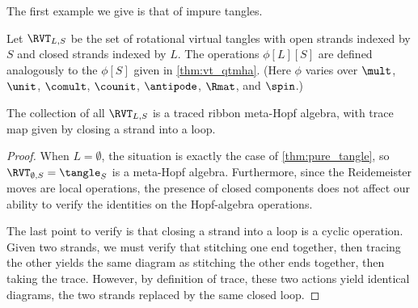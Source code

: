 The first example we give is that of impure tangles.

\begin{definition}
        Let $\RVT_{L, S}$ be the set of rotational virtual tangles with open
        strands indexed by $S$ and closed strands indexed by $L$. The operations
        $ϕ[L][S]$ are defined analogously to the $ϕ[S]$ given in
        \cref{thm:vt_qtmha}. (Here $ϕ$ varies over $\mult$, $\unit$, $\comult$,
        $\counit$, $\antipode$, $\Rmat$, and $\spin$.)
\end{definition}

\begin{lemma}
        The collection of all $\RVT_{L, S}$ is a traced ribbon meta-Hopf
        algebra, with trace map given by closing a strand into a loop.
\end{lemma}
\begin{proof}
        When $L = \emptyset$, the situation is exactly the case of
        \cref{thm:pure_tangle}, so $\RVT_{\emptyset, S} = \tangle_S$ is a
        meta-Hopf algebra. Furthermore, since the Reidemeister moves are local
        operations, the presence of closed components does not affect our
        ability to verify the identities on the Hopf-algebra operations.

        The last point to verify is that closing a strand into a loop is a
        cyclic operation. Given two strands, we must verify that stitching one
        end together, then tracing the other yields the same diagram as
        stitching the other ends together, then taking the trace. However, by
        definition of trace, these two actions yield identical diagrams, the two
        strands replaced by the same closed loop.
\end{proof}


